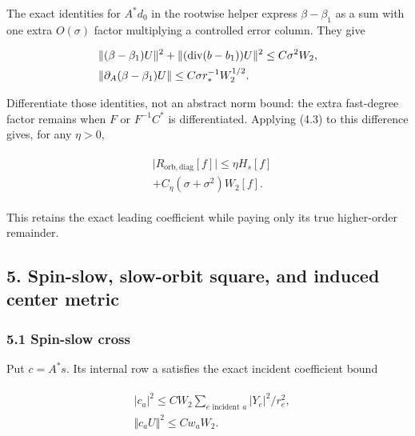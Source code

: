 The exact identities for \(A^{*}d_{0}\) in the rootwise helper express
\(\beta -\beta _{1}\) as a sum with one extra \(O(\sigma )\) factor
multiplying a controlled error column. They give

\begin{gather*}
\begin{aligned}
& \Vert (\beta -\beta _{1})U\Vert ^{2}+\Vert (\operatorname{div} (b-b_{1}))U\Vert ^{2}\le C \sigma ^{2} W_{2}, \\
& \Vert \partial _{A}(\beta -\beta _{1})U\Vert \le C \sigma  r_{*}^{-1} W_{2}^{1/2}.
\end{aligned}\notag
\end{gather*}

Differentiate those identities, not an abstract norm bound: the extra
fast-degree factor remains when \(F\) or \(F^{-1}C^{*}\) is
differentiated. Applying (4.3) to this difference gives, for any
\(\eta >0\),

\begin{gather*}
\begin{aligned}
& \vert R_{\mathrm{orb},\mathrm{diag}}[f]\vert \le \eta  H_{s}[f] \\
& +C_{\eta}(\sigma +\sigma ^{2})W_{2}[f].
\end{aligned}\tag{4.7}
\end{gather*}

This retains the exact leading coefficient while paying only its true
higher-order remainder.

\subsection{5. Spin-slow, slow-orbit square, and induced center
metric}\label{i-spin-slow-slow-orbit-square-and-induced-center-metric}

\subsubsection{5.1 Spin-slow cross}\label{i-spin-slow-cross}

Put \(c=A^{*}s\). Its internal row a satisfies the exact incident
coefficient bound

\begin{gather*}
\begin{aligned}
& \vert c_{a}\vert ^{2}\le C W_{2} \sum _{e \text{ incident } a}\vert Y_{e}\vert ^{2}/r_{e}^{2}, \\
& \Vert c_{a} U\Vert ^{2}\le C w_{a} W_{2}.
\end{aligned}\tag{5.1}
\end{gather*}

